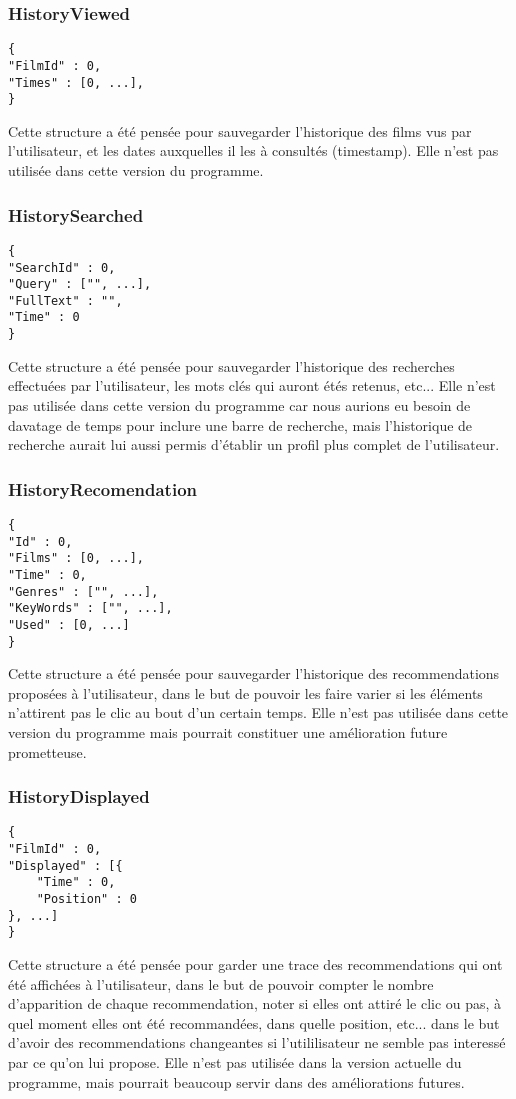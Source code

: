 \subsubsection{HistoryViewed}
\begin{lstlisting}
{
"FilmId" : 0,
"Times" : [0, ...],
}
\end{lstlisting}
Cette structure a été pensée pour sauvegarder l'historique des films vus par l'utilisateur, et les dates auxquelles il les à consultés (timestamp).
Elle n'est pas utilisée dans cette version du programme.

\subsubsection{HistorySearched}

\begin{lstlisting}
{
"SearchId" : 0,
"Query" : ["", ...],
"FullText" : "",
"Time" : 0
}
\end{lstlisting}
Cette structure a été pensée pour sauvegarder l'historique des recherches effectuées par l'utilisateur, les mots clés qui auront étés retenus, etc...
Elle n'est pas utilisée dans cette version du programme car nous aurions eu besoin de davatage de temps pour inclure une barre de recherche, mais l'historique de recherche aurait lui aussi permis d'établir un profil plus complet de l'utilisateur.


\subsubsection{HistoryRecomendation}

\begin{lstlisting}
{
"Id" : 0,
"Films" : [0, ...],
"Time" : 0,
"Genres" : ["", ...],
"KeyWords" : ["", ...],
"Used" : [0, ...]
}
\end{lstlisting}
Cette structure a été  pensée pour sauvegarder l'historique des recommendations proposées à l'utilisateur, dans le but de pouvoir les faire varier si les éléments n'attirent pas le clic au bout d'un certain temps. Elle n'est pas utilisée dans cette version du programme mais pourrait constituer une amélioration future prometteuse.

\subsubsection{HistoryDisplayed}

\begin{lstlisting}
{
"FilmId" : 0,
"Displayed" : [{
	"Time" : 0,
	"Position" : 0
}, ...]
}
\end{lstlisting}
Cette structure a été pensée pour garder une trace des recommendations qui ont été affichées à l'utilisateur, dans le but de pouvoir compter le nombre d'apparition de chaque recommendation, noter si elles ont attiré le clic ou pas, à quel moment elles ont été recommandées, dans quelle position, etc... dans le but d'avoir des recommendations changeantes si l'utililisateur ne semble pas interessé par ce qu'on lui propose.
Elle n'est pas utilisée dans la version actuelle du programme, mais pourrait beaucoup servir dans des améliorations futures.

